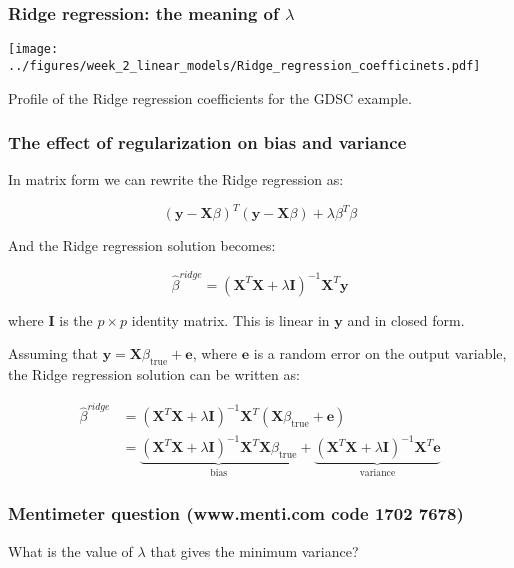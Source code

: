 \documentclass[notes]{beamer}          %
\begin{document}
\begin{frame}
\frametitle{Ridge regression: the meaning of $\lambda$}


\begin{center}

\texttt{[image: ../figures/week\_2\_linear\_models/Ridge\_regression\_coefficinets.pdf]}
\end{center}

Profile of the Ridge regression coefficients for the GDSC example.

\end{frame}

\begin{frame}
\frametitle{The effect of regularization on bias and variance}
In matrix form we can rewrite the Ridge regression as:

\begin{equation*}
    (\mathbf{y} - \mathbf{X}\beta)^T (\mathbf{y} - \mathbf{X}\beta) + \lambda\beta^T\beta
\end{equation*}

And the Ridge regression solution becomes:

\begin{equation*}
    \hat{\beta}^{ridge} = (\mathbf{X}^T \mathbf{X} + \lambda \mathbf{I})^{-1}\mathbf{X}^T\mathbf{y} 
\end{equation*}

where $\mathbf{I}$ is the $p \times p$ identity matrix. This is linear in $\mathbf{y}$ and in closed form.

Assuming that $\mathbf{y} = \mathbf{X}\beta_{\mathrm{true}} + \mathbf{e}$, where $\mathbf{e}$ is a random error on the output variable, the Ridge regression solution can be written as:

\begin{align*}
    \hat{\beta}^{ridge} &= (\mathbf{X}^T \mathbf{X} + \lambda \mathbf{I})^{-1}\mathbf{X}^T(\mathbf{X}\beta_{\mathrm{true}} + \mathbf{e}) \\
    &= \underbrace{(\mathbf{X}^T \mathbf{X} + \lambda \mathbf{I})^{-1}\mathbf{X}^T\mathbf{X}\beta_{\mathrm{true}}}_{\textrm{bias}} + \underbrace{(\mathbf{X}^T \mathbf{X} + \lambda \mathbf{I})^{-1}\mathbf{X}^T\mathbf{e}}_{\textrm{variance}}
\end{align*}

\end{frame}

\begin{frame}
\frametitle{Mentimeter question (www.menti.com code 1702 7678)}

What is the value of $\lambda$ that gives the minimum variance?

\end{frame}
\end{document}
